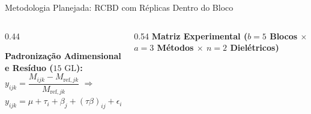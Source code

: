 \documentclass[aspectratio=169,xcolor=table]{beamer}
\begin{document}
\begin{frame}{Metodologia Planejada: RCBD com Réplicas Dentro do Bloco}
\begin{columns}[c]
\begin{column}{0.44\textwidth}
\begin{tcolorbox}
            \end{tcolorbox}

            \vspace{0.10cm}
            \begin{tcolorbox}[colback=gray!8, colframe=meuvermelho!75!black, boxrule=0.6pt, arc=2pt, boxsep=2pt, left=2pt, right=2pt, top=2pt, bottom=2pt]
                \centering \tiny
                \textbf{Padronização Adimensional e Resíduo ($15\text{ GL}$):}\\[2pt]
                $y_{ijk} = \dfrac{M_{ijk} - M_{\text{ref},jk}}{M_{\text{ref},jk}}$ \quad $\Rightarrow$ \quad $y_{ijk} = \mu + \tau_i + \beta_j + (\tau\beta)_{ij} + \epsilon_{ijk}$
            \end{tcolorbox}
        \end{column}

        \begin{column}{0.54\textwidth}
            \centering
            \scriptsize \textbf{Matriz Experimental ($b = 5$ Blocos $\times$ $a = 3$ Métodos $\times$ $n = 2$ Dielétricos)}
            \vspace{0.1cm}


\end{column}
\end{columns}
\end{frame}
\end{document}
